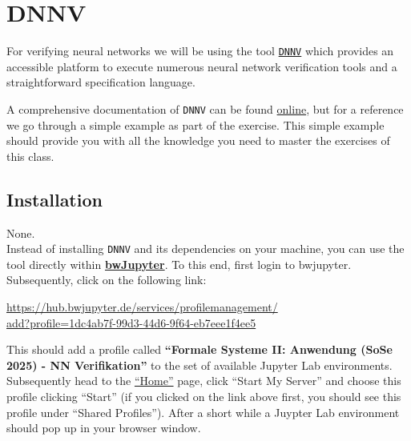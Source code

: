 \documentclass[11pt,fleqn]{article}
\begin{document}

\section*{DNNV}

For verifying neural networks we will be using the tool \href{https://github.com/dlshriver/dnnv}{\texttt{DNNV}} which provides an accessible platform to execute numerous neural network verification tools and a straightforward specification language.

A comprehensive documentation of \texttt{DNNV} can be found \href{https://docs.dnnv.org/en/stable/}{online}, but for a reference we go through a simple example as part of the exercise.
This simple example should provide you with all the knowledge you need to master the exercises of this class.

\subsection*{Installation}
None.\\
Instead of installing \texttt{DNNV} and its dependencies on your machine, you can use the tool directly within \href{https://hub.bwjupyter.de}{\textbf{bwJupyter}}.
To this end, first login to bwjupyter. Subsequently, click on the following link:

\begin{center}
\href{https://hub.bwjupyter.de/services/profilemanagement/add?profile=1dc4ab7f-99d3-44d6-9f64-eb7eee1f4ee5}{https://hub.bwjupyter.de/services/profilemanagement/\\add?profile=1dc4ab7f-99d3-44d6-9f64-eb7eee1f4ee5}\\
\end{center}

This should add a profile called \textbf{``Formale Systeme II: Anwendung (SoSe 2025) - NN Verifikation''} to the set of available Jupyter Lab environments.
Subsequently head to the \href{https://hub.bwjupyter.de/hub/home}{``Home''} page, click ``Start My Server'' and choose this profile clicking ``Start'' (if you clicked on the link above first, you should see this profile under ``Shared Profiles'').
After a short while a Juypter Lab environment should pop up in your browser window.
\end{document}
